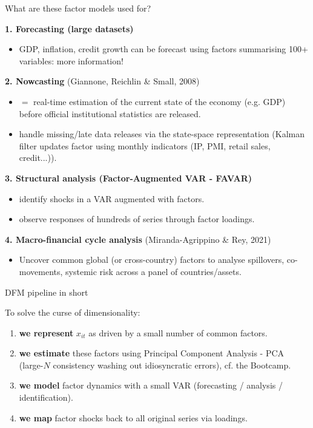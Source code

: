 \documentclass{beamer}
\begin{document}
\begin{frame}{What are these factor models used for?}
\small

\textbf{1. Forecasting (large datasets)}
\begin{itemize}
  \item GDP, inflation, credit growth can be forecast using factors summarising 100+ variables: more information!
\end{itemize}

\textbf{2. Nowcasting} (Giannone, Reichlin \& Small, 2008)
\begin{itemize}
  \item  $=$ real-time estimation of the current state of the economy (e.g. GDP) before official institutional statistics are released.
  \item handle missing/late data releases via the state-space representation (Kalman filter updates factor using monthly indicators (IP, PMI, retail sales, credit...)). \hyperlink{MF}{}
\end{itemize}


\textbf{3. Structural analysis (Factor-Augmented VAR - FAVAR)}
\begin{itemize}
  \item identify shocks in a VAR augmented with factors.
  \item observe responses of hundreds of series through factor loadings.
\end{itemize}

\textbf{4. Macro-financial cycle analysis} (Miranda-Agrippino \& Rey, 2021)
\begin{itemize}
  \item Uncover common global (or cross-country) factors to analyse spillovers, co-movements, systemic risk across a panel of countries/assets. 
\end{itemize}

\end{frame}


\begin{frame}{DFM pipeline in short}
\small

To solve the curse of dimensionality:
\begin{enumerate}
  \item \textbf{we represent} $x_{it}$ as driven by a small number of common factors.
  \item \textbf{we estimate} these factors using Principal Component Analysis - PCA (large-$N$ consistency washing out idiosyncratic errors), cf. the Bootcamp.
  \item \textbf{we model} factor dynamics with a small VAR (forecasting / analysis / identification).
  \item \textbf{we map} factor shocks back to all original series via loadings.
\end{enumerate}
\end{frame}
\end{document}
